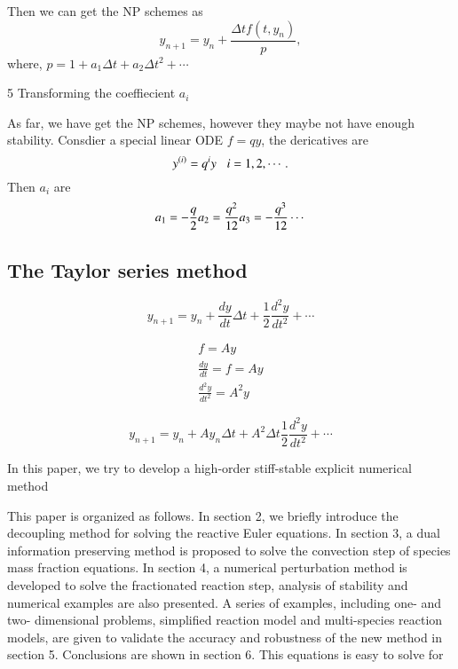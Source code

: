 \documentclass[review]{elsarticle}
\theoremstyle{plain}\newtheorem{definition}{\sc{Definition}}
\theoremstyle{defination}\newtheorem{example}{Example}[section]
\numberwithin{equation}{section}
\numberwithin{table}{section}
\begin{document}
{Then we can get the NP schemes as 
\begin{equation}
  y_{n+1}=y_n+\frac{\Delta tf(t,y_n)}{p},
  \end{equation}
where, $p=1+a_1 \Delta t +a_2\Delta t^2+\cdots$

\textcircled{\small {5}} Transforming the coeffiecient $a_i$ 

As far, we have get the NP schemes, however they maybe not have enough stability. Consdier a special linear ODE $f=qy$,  the dericatives are
\begin{equation}
  y^{(i)}= q^iy\hspace{0.3cm} i=1,2,\cdots.
\end{equation}
Then $a_i$ are
\begin{equation}
  a_1=-\frac{q}{2}\\
  a_2=\frac{q^2}{12}\\
  a_3=-\frac{q^3}{12}\\
  \cdots
  \end{equation}














  \subsection{The Taylor series method}

  \begin{equation}
	y_{n+1} = y_n + \frac{dy}{dt}\Delta t +\frac{1}{2} \frac{d^2y}{dt^2}+\cdots
	\end{equation}

\begin{equation}
\begin{align}
  f= Ay\\
  \frac{dy}{dt}=f=Ay\\
  \frac{d^2y}{dt^2}= A^2y 
\end{align}
  \end{equation}


  \begin{equation}
	y_{n+1} = y_n + A y_n \Delta t + A^2\Delta t \frac{1}{2} \frac{d^2y}{dt^2}+\cdots
	\end{equation}


 In this paper, we try to develop a high-order stiff-stable explicit numerical method 

This paper is organized as follows. In section 2, we briefly introduce the decoupling method for solving the reactive Euler equations. In section 3, a dual information preserving method is proposed to solve the convection step of species mass fraction equations. In section 4, a numerical perturbation method is developed to solve the fractionated reaction step, analysis of stability and numerical examples are also presented. A series of examples, including one- and two- dimensional problems, simplified reaction model and multi-species reaction models, are given to validate the accuracy and robustness of the new method in section 5. Conclusions are shown in section 6.
This equations is easy to solve for  


}
\end{document}
